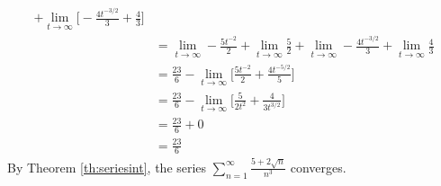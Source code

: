 \begin{ex}
\begin{sol}
\begin{align*}
      + \lim_{t\to\infty}\bigg[ -\frac{4t^{-3/2}}{3} +\frac{4}{3}
        \bigg]\\
      &=\lim_{t\to\infty} -\frac{5t^{-2}}{2}+\lim_{t\to\infty} \frac{5}{2}
      + \lim_{t\to\infty} -\frac{4t^{-3/2}}{3} +\lim_{t\to\infty}\frac{4}{3} \\
      &=\frac{23}{6}-\lim_{t\to\infty}\bigg[
        \frac{5t^{-2}}{2}+\frac{4t^{-5/2}}{5} \bigg] \\
      &=\frac{23}{6}-\lim_{t\to\infty}\bigg[
        \frac{5}{2t^2}+\frac{4}{3t^{3/2}} \bigg]\\
        &=\frac{23}{6}+0 \\
        &= \frac{23}{6}
    \end{align*}
    By Theorem \ref{th:seriesint}, the series
    \( \sum_{n=1}^{\infty} \frac{5+2\sqrt n}{n^3} \)
    converges.
  \end{sol}
\end{ex}
